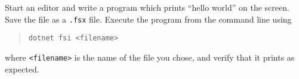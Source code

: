 Start an editor and write a program which prints ``hello world'' on the screen. Save the file as a \lstinline[language=console]{.fsx} file. Execute the program from the command line using
\begin{quote}
\lstinline[language=console]{dotnet fsi <filename>}
\end{quote}
where \lstinline[language=console]{<filename>} is the name of the file you chose, and verify that it prints as expected.
